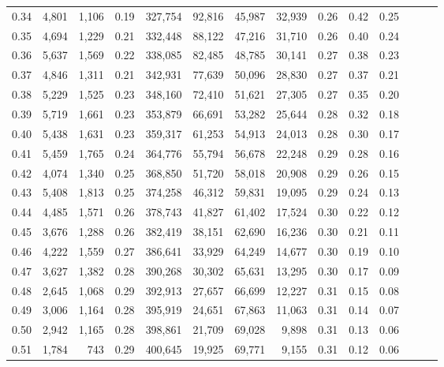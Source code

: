 \begin{tabular}{rrrrrrrrrrrrrr}
0.34 &   4,801 &  1,106 &  0.19 &  327,754 &   92,816 &  45,987 &  32,939 &  0.26 &  0.42 &      0.25 \\
0.35 &   4,694 &  1,229 &  0.21 &  332,448 &   88,122 &  47,216 &  31,710 &  0.26 &  0.40 &      0.24 \\
0.36 &   5,637 &  1,569 &  0.22 &  338,085 &   82,485 &  48,785 &  30,141 &  0.27 &  0.38 &      0.23 \\
0.37 &   4,846 &  1,311 &  0.21 &  342,931 &   77,639 &  50,096 &  28,830 &  0.27 &  0.37 &      0.21 \\
0.38 &   5,229 &  1,525 &  0.23 &  348,160 &   72,410 &  51,621 &  27,305 &  0.27 &  0.35 &      0.20 \\
0.39 &   5,719 &  1,661 &  0.23 &  353,879 &   66,691 &  53,282 &  25,644 &  0.28 &  0.32 &      0.18 \\
0.40 &   5,438 &  1,631 &  0.23 &  359,317 &   61,253 &  54,913 &  24,013 &  0.28 &  0.30 &      0.17 \\
0.41 &   5,459 &  1,765 &  0.24 &  364,776 &   55,794 &  56,678 &  22,248 &  0.29 &  0.28 &      0.16 \\
0.42 &   4,074 &  1,340 &  0.25 &  368,850 &   51,720 &  58,018 &  20,908 &  0.29 &  0.26 &      0.15 \\
0.43 &   5,408 &  1,813 &  0.25 &  374,258 &   46,312 &  59,831 &  19,095 &  0.29 &  0.24 &      0.13 \\
0.44 &   4,485 &  1,571 &  0.26 &  378,743 &   41,827 &  61,402 &  17,524 &  0.30 &  0.22 &      0.12 \\
0.45 &   3,676 &  1,288 &  0.26 &  382,419 &   38,151 &  62,690 &  16,236 &  0.30 &  0.21 &      0.11 \\
0.46 &   4,222 &  1,559 &  0.27 &  386,641 &   33,929 &  64,249 &  14,677 &  0.30 &  0.19 &      0.10 \\
0.47 &   3,627 &  1,382 &  0.28 &  390,268 &   30,302 &  65,631 &  13,295 &  0.30 &  0.17 &      0.09 \\
0.48 &   2,645 &  1,068 &  0.29 &  392,913 &   27,657 &  66,699 &  12,227 &  0.31 &  0.15 &      0.08 \\
0.49 &   3,006 &  1,164 &  0.28 &  395,919 &   24,651 &  67,863 &  11,063 &  0.31 &  0.14 &      0.07 \\
0.50 &   2,942 &  1,165 &  0.28 &  398,861 &   21,709 &  69,028 &   9,898 &  0.31 &  0.13 &      0.06 \\
0.51 &   1,784 &    743 &  0.29 &  400,645 &   19,925 &  69,771 &   9,155 &  0.31 &  0.12 &      0.06 \\

\end{tabular}
